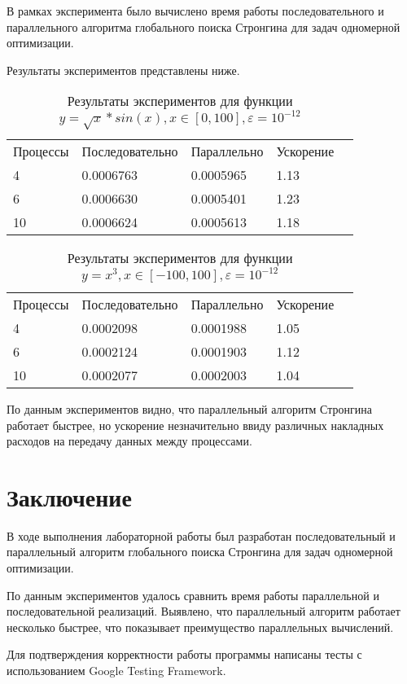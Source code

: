 \documentclass{report}
\begin{document}
\par В рамках эксперимента было вычислено время работы последовательного и параллельного алгоритма глобального поиска Стронгина для задач одномерной оптимизации.
\par Результаты экспериментов представлены ниже.

\begin{table}[!h]
\caption{Результаты экспериментов для функции \\ $y = \sqrt{x}*sin(x), x \in [0, 100], \varepsilon = 10^{-12}$}
\centering
\begin{tabular}{lllll}
Процессы & Последовательно & Параллельно & Ускорение  \\
4        & 0.0006763         & 0.0005965     & 1.13       \\
6        & 0.0006630         & 0.0005401     & 1.23       \\
10       & 0.0006624         & 0.0005613     & 1.18       
\end{tabular}
\end{table}

\begin{table}[!h]
\caption{Результаты экспериментов для функции \\ $y = x^3, x \in [-100, 100], \varepsilon = 10^{-12}$}
\centering
\begin{tabular}{lllll}
Процессы & Последовательно & Параллельно & Ускорение  \\
4        & 0.0002098         & 0.0001988     & 1.05       \\
6        & 0.0002124         & 0.0001903     & 1.12       \\
10       & 0.0002077         & 0.0002003     & 1.04       
\end{tabular}
\end{table}

\par По данным экспериментов видно, что параллельный алгоритм Стронгина работает быстрее, но ускорение незначительно ввиду различных накладных расходов на передачу данных между процессами.
\newpage

\section*{Заключение}
В ходе выполнения лабораторной работы был разработан последовательный и параллельный алгоритм глобального поиска Стронгина для задач одномерной оптимизации.
\par По данным экспериментов удалось сравнить время работы параллельной и последовательной реализаций. Выявлено, что параллельный алгоритм работает несколько быстрее, что показывает преимущество параллельных вычислений.
\par Для подтверждения корректности работы программы написаны тесты с использованием Google Testing Framework.
\newpage
\end{document}
